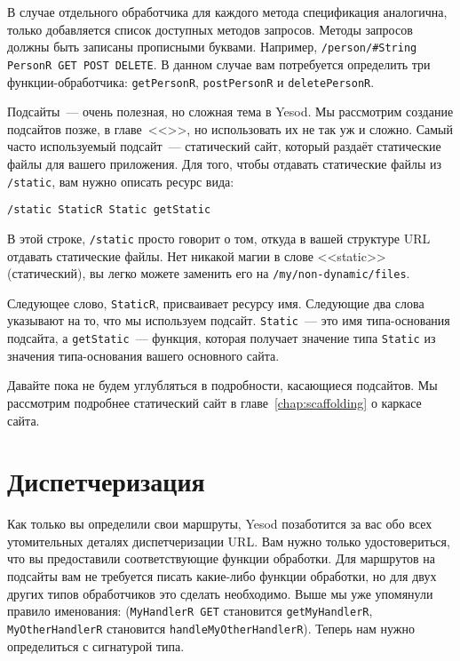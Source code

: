 В случае отдельного обработчика для каждого метода спецификация аналогична,
только добавляется список доступных методов запросов. Методы запросов
должны быть записаны прописными буквами. Например,
\lstinline!/person/#String PersonR GET POST DELETE!.
В данном случае вам потребуется определить три функции-обработчика:
\lstinline!getPersonR!, \lstinline!postPersonR! и \lstinline!deletePersonR!.

Подсайты~--- очень полезная, но сложная тема в Yesod. Мы рассмотрим
создание подсайтов позже, в главе~<<>>,
но использовать их не так уж и сложно. Самый
часто используемый подсайт~--- статический сайт, который
раздаёт статические файлы для вашего приложения. Для того, чтобы
отдавать статические файлы из \lstinline!/static!, вам нужно описать
ресурс вида:
\begin{verbatim}
/static StaticR Static getStatic
\end{verbatim}

В этой строке, \lstinline!/static! просто говорит о том, откуда в вашей
структуре URL отдавать статические файлы. Нет никакой магии в слове
<<static>> (статический), вы легко можете заменить его на
\lstinline!/my/non-dynamic/files!.

Следующее слово, \lstinline!StaticR!, присваивает ресурсу имя. Следующие два слова
указывают на то, что мы используем подсайт. \lstinline!Static!~--- это имя
типа-основания подсайта, а \lstinline!getStatic!~--- функция, которая получает
значение типа \lstinline!Static! из значения типа-основания вашего основного сайта.

Давайте пока не будем углубляться в подробности, касающиеся подсайтов. Мы рассмотрим
подробнее статический сайт в главе~\ref{chap:scaffolding} о каркасе сайта.

\section{Диспетчеризация}
Как только вы определили свои маршруты, Yesod позаботится за вас обо всех
утомительных деталях диспетчеризации URL. Вам нужно только
удостовериться, что вы предоставили соответствующие функции
обработки. Для маршрутов на подсайты вам не требуется писать
какие-либо функции обработки, но для двух других типов обработчиков
это сделать необходимо. Выше мы уже упомянули правило именования:
(\lstinline!MyHandlerR GET! становится \lstinline!getMyHandlerR!,
\lstinline!MyOtherHandlerR! становится \lstinline!handleMyOtherHandlerR!).
Теперь нам нужно определиться с сигнатурой типа.

